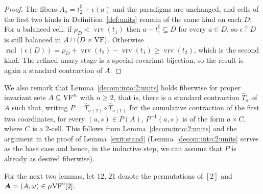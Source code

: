 \documentclass[12pt]{amsart}
\theoremstyle{plain}
\theoremstyle{definition}
\theoremstyle{remark}
\numberwithin{equation}{section}
\theoremstyle{plain}
\newcommand{\VF}{\textup{VF}}
\newcommand{\0}{\emptyset}
\newcommand{\rest}{\upharpoonright}
\newcommand{\sub}{\subseteq}
\newcommand{\mVF}{{\mu}{\VF}}
\DeclareMathOperator{\rad}{rad}
\DeclareMathOperator{\vrv}{vrv}
\begin{document}
\begin{proof}
The fibers $A_a = t_2^\sharp + \epsilon(a)$ and the paradigms are unchanged, and cells of the first two kinds in Definition~\ref{def:units} remain of the same kind on each $D$. For a balanced cell, if $\rho_D < \vrv(t_1)$ then $a - t_1^\sharp \sub D$ for every $a \in D$, so $\epsilon \rest D$ is still balanced in $A \cap (D \times \VF)$. Otherwise $\rad(\epsilon(D)) = \rho_D + \vrv(t_2) - \vrv(t_1) \geq \vrv(t_2)$, which is the second kind. The refined unary stage is a special covariant bijection, so the result is again a standard contraction of $A$.
\end{proof}

We also remark that Lemma~\ref{decom:into:2:units} holds fiberwise for proper invariant sets $A \sub \VF^n$ with $n \geq 2$, that is, there is a standard contraction $\hat T_\sigma$ of $A$ such that, writing $P = \hat T_{\sigma(2)} \circ \hat T_{\sigma(1)}$ for the cumulative contraction of the first two coordinates, for every $(a, s) \in P(A)$, $P^{-1}(a, s)$ is of the form $a \times C$, where $C$ is a $2$-cell. This follows from Lemma~\ref{decom:into:2:units} and the argument in the proof of  Lemma~\ref{exit:stand} (Lemma~\ref{decom:into:2:units} serves as the base case and hence, in the inductive step, we can assume that $P$ is already as desired fiberwise).


For the next two lemmas, let $12$, $21$ denote the permutations of $[2]$ and $\bm A = (A, \omega) \in \mVF^\diamond[2]$.
\end{document}
